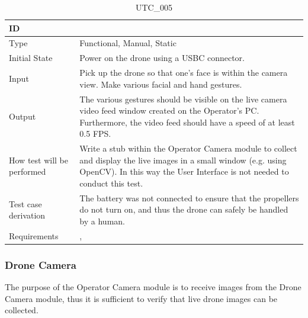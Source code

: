 \documentclass[12pt, titlepage]{article}
\begin{document}
\begin{table}[!h]
\begin{center}
\caption {UTC\_005}
\label{tab:UTC_005}
\begin{tabular}{ | m{3.2cm} | m{12.2cm} | } 
\hline
ID & \nameref{tab:UTC_005} \\ 
\hline
Type &  Functional, Manual, Static  \\ 
\hline
Initial State &  Power on the drone using a USBC connector. \\ 
\hline
Input & Pick up the drone so that one's face is within the camera view. Make various facial and hand gestures.\\ 
\hline
Output &  The various gestures should be visible on the live camera video feed window created on the Operator's PC. Furthermore, the video feed should have a speed of at least 0.5 FPS. \\ 
\hline
How test will be performed & Write a stub within the Operator Camera module to collect and display the live images in a small window (e.g. using OpenCV). In this way the User Interface is not needed to conduct this test. \\ 
\hline
Test case derivation &  The battery was not connected to ensure that the propellers do not turn on, and thus the drone can safely be handled by a human. \\ 
\hline
Requirements &  \nameref{GEN_002}, \nameref{PERF_004} \\ 
\hline
\end{tabular}
\end{center}
\end{table}


\subsubsection{Drone Camera}

The purpose of the Operator Camera module is to receive images from the Drone Camera module, thus it is sufficient to verify that live drone images can be collected.
\end{document}
